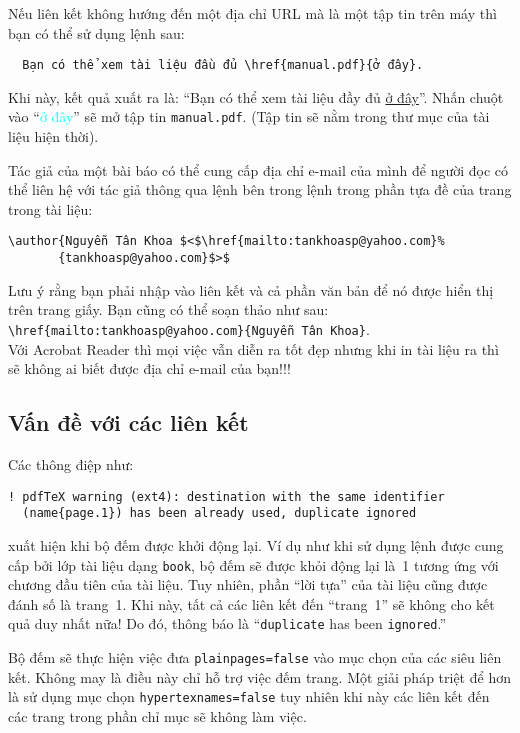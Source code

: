 Nếu liên kết không hướng đến một địa chỉ URL mà là một tập tin trên máy thì bạn có thể sử dụng lệnh sau:
\begin{verbatim}
  Bạn có thể xem tài liệu đầu đủ \href{manual.pdf}{ở đây}.
\end{verbatim}
Khi này, kết quả xuất ra là: ``Bạn có thể xem tài liệu đầy đủ \href{manual.pdf}{ở đây}''. Nhấn chuột vào ``\textcolor{cyan}{ở đây}'' sẽ mở tập tin \texttt{manual.pdf}. (Tập tin sẽ nằm trong thư mục của tài liệu hiện thời).

Tác giả của một bài báo có thể cung cấp địa chỉ e-mail của mình để người đọc có thể liên hệ với tác giả thông qua lệnh  bên trong lệnh  trong phần tựa đề của trang trong tài liệu:
\begin{code}
\begin{verbatim}
\author{Nguyễn Tân Khoa $<$\href{mailto:tankhoasp@yahoo.com}%
       {tankhoasp@yahoo.com}$>$
\end{verbatim}
\end{code}
Lưu ý rằng bạn phải nhập vào liên kết và cả phần văn bản để nó được hiển thị trên trang giấy. Bạn cũng có thể soạn thảo như sau:\\
\verb+\href{mailto:tankhoasp@yahoo.com}{Nguyễn Tân Khoa}+. \\
Với Acrobat Reader thì mọi việc vẫn diễn ra tốt đẹp nhưng khi in tài liệu ra thì sẽ không ai biết được địa chỉ e-mail của bạn!!!

\subsection{Vấn đề với các liên kết}
Các thông điệp như:
\begin{verbatim}
! pdfTeX warning (ext4): destination with the same identifier
  (name{page.1}) has been already used, duplicate ignored
\end{verbatim}
\noindent xuất hiện khi bộ đếm được khởi động lại. Ví dụ như khi sử dụng lệnh  được cung cấp bởi lớp tài liệu dạng \texttt{book}, bộ đếm sẽ được khỏi động lại là~1 tương ứng với chương đầu tiên của tài liệu. Tuy nhiên, phần ``lời tựa'' của tài liệu cũng được đánh số là trang~1. Khi này, tất cả các liên kết đến ``trang~1'' sẽ không cho kết quả duy nhất nữa! Do đó, thông báo là ``\verb+duplicate+ has been \verb+ignored+.''

Bộ đếm sẽ thực hiện việc đưa \texttt{plainpages=false} vào mục chọn của các siêu liên kết. Không may là điều này chỉ hỗ trợ việc đếm trang. Một giải pháp triệt để hơn là sử dụng mục chọn \texttt{hypertexnames=false} tuy nhiên khi này các liên kết đến các trang trong phần chỉ mục sẽ không làm việc.

